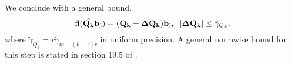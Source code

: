 We conclude with a general bound, $$\mathrm{fl}(\hat{\mathbf{Q_k}}\mathbf{b_j}) = (\mathbf{Q_k} + \mathbf{\Delta Q_k})\mathbf{b_j}, \;\; |\mathbf{\Delta Q_k}| \leq \tilde{\gamma}_{Q_k},$$
where $\tilde{\gamma}_{Q_k} = r\tilde{\gamma}_{m-(k-1)r}$ in uniform precision.
A general normwise bound for this step is stated in section 19.5 of \cite{Higham2002}.

